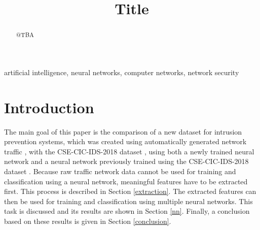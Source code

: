 \documentclass[conference]{IEEEtran}
\begin{document}
\title{Title}

\author{
\and
{}
}

\maketitle

\begin{abstract}
@TBA
\end{abstract}

\begin{IEEEkeywords}
artificial intelligence, neural networks, computer networks, network security
\end{IEEEkeywords}

\section{Introduction}
The main goal of this paper is the comparison of a new dataset for intrusion prevention systems, which was created using automatically generated network traffic \cite{paper1}, with the CSE-CIC-IDS-2018 dataset \cite{max2}, using both a newly trained neural network and a neural network previously trained using the CSE-CIC-IDS-2018 dataset \cite{max1}. Because raw traffic network data cannot be used for training and classification using a neural network, meaningful features have to be extracted first. This process is described in Section \ref{extraction}. The extracted features can then be used for training and classification using multiple neural networks. This task is discussed and its results are shown in Section \ref{nn}. Finally, a conclusion based on these results is given in Section \ref{conclusion}.
\end{document}
